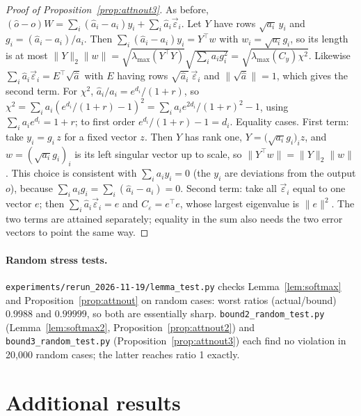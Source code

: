 \documentclass[10pt]{article}
\theoremstyle{plain}
\theoremstyle{definition}
\theoremstyle{remark}
\newcommand{\T}{^{\top}}
\begin{document}
\begin{proof}[Proof of Proposition~\ref{prop:attnout3}]
As before, $(\hat o-o)W=\sum_i(\hat a_i-a_i)y_i+\sum_i\hat a_i\vec\varepsilon_i$. Let $Y$ have rows $\sqrt{a_i}\,y_i$ and $g_i=(\hat a_i-a_i)/a_i$. Then $\sum_i(\hat a_i-a_i)y_i=Y\T w$ with $w_i=\sqrt{a_i}g_i$, so its length is at most $\lVert Y\rVert_2\lVert w\rVert=\sqrt{\lambda_{\max}(Y\T Y)}\sqrt{\sum_ia_ig_i^2}=\sqrt{\lambda_{\max}(C_y)\chi^2}$. Likewise $\sum_i\hat a_i\vec\varepsilon_i=E\T\sqrt{\hat a}$ with $E$ having rows $\sqrt{\hat a_i}\,\vec\varepsilon_i$ and $\lVert\sqrt{\hat a}\rVert=1$, which gives the second term. For $\chi^2$, $\hat a_i/a_i=e^{d_i}/(1+r)$, so $\chi^2=\sum_ia_i(e^{d_i}/(1+r)-1)^2=\sum_ia_ie^{2d_i}/(1+r)^2-1$, using $\sum_ia_ie^{d_i}=1+r$; to first order $e^{d_i}/(1+r)-1=d_i$. Equality cases. First term: take $y_i=g_i\,z$ for a fixed vector $z$. Then $Y$ has rank one, $Y=\bigl(\sqrt{a_i}g_i\bigr)_i z$, and $w=(\sqrt{a_i}g_i)_i$ is its left singular vector up to scale, so $\lVert Y\T w\rVert=\lVert Y\rVert_2\lVert w\rVert$. This choice is consistent with $\sum_ia_iy_i=0$ (the $y_i$ are deviations from the output $o$), because $\sum_ia_ig_i=\sum_i(\hat a_i-a_i)=0$. Second term: take all $\vec\varepsilon_i$ equal to one vector $e$; then $\sum_i\hat a_i\vec\varepsilon_i=e$ and $C_\varepsilon=e\T e$, whose largest eigenvalue is $\lVert e\rVert^2$. The two terms are attained separately; equality in the sum also needs the two error vectors to point the same way.
\end{proof}

\paragraph{Random stress tests.}
\texttt{experiments/rerun\_2026-11-19/lemma\_test.py} checks Lemma~\ref{lem:softmax} and Proposition~\ref{prop:attnout} on random cases: worst ratios (actual/bound) $0.9988$ and $0.99999$, so both are essentially sharp. \texttt{bound2\_random\_test.py} (Lemma~\ref{lem:softmax2}, Proposition~\ref{prop:attnout2}) and \texttt{bound3\_random\_test.py} (Proposition~\ref{prop:attnout3}) each find no violation in 20{,}000 random cases; the latter reaches ratio 1 exactly.


\section{Additional results}
\label{app:extra}
\end{document}
